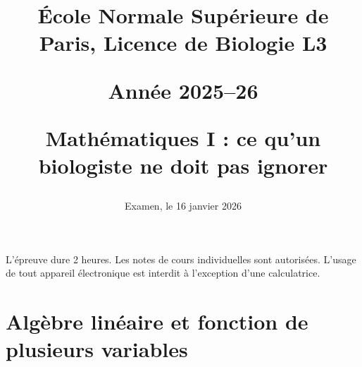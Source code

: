 \documentclass[french, 11pt]{article}
\title{\normalsize{\sc École Normale Supérieure de Paris, Licence de Biologie L3}
  
  \bigskip
  \normalsize{\sc Année 2025–26}
  
  \bigskip
  \large{\bf Mathématiques I : ce qu’un biologiste ne doit pas ignorer} 
  
}
\date{Examen, le 16 janvier 2026}
\renewcommand{\subsubsection}{\section}
\newcommand{\alglin}{/home/robin/ENSEIGN/Cours/MathBiologie/L3-ENS-Math1/Exercices/AlgLin}
\newcommand{\multivar}{/home/robin/ENSEIGN/Cours/MathBiologie/L3-ENS-Math1/Exercices/MultiVar}
\newcommand{\equadiff}{/home/robin/ENSEIGN/Cours/MathBiologie/L3-ENS-Math1/Exercices/EquaDiff}
\newcommand{\probas}{/home/robin/ENSEIGN/Cours/MathBiologie/L3-ENS-Math1/Exercices/Probas}
\begin{document}

\maketitle

\bigskip
L'épreuve dure 2 heures. 
Les notes de cours individuelles sont autorisées.
L’usage de tout appareil électronique est interdit à l’exception d’une calculatrice.

\section{Algèbre linéaire et fonction de plusieurs variables}
\renewcommand{\subsubsection}{\subsection}


% 


\renewcommand{\subsubsection}{\section}




\end{document}
